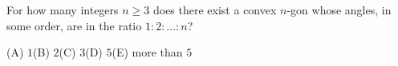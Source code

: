 For how many integers $n\ge3$ does there exist a convex $n$-gon whose angles, in some order, are in the ratio $1:2:\dots:n$?

(A) $1$\quad (B) $2$\quad (C) $3$\quad (D) $5$\quad (E) more than $5$
